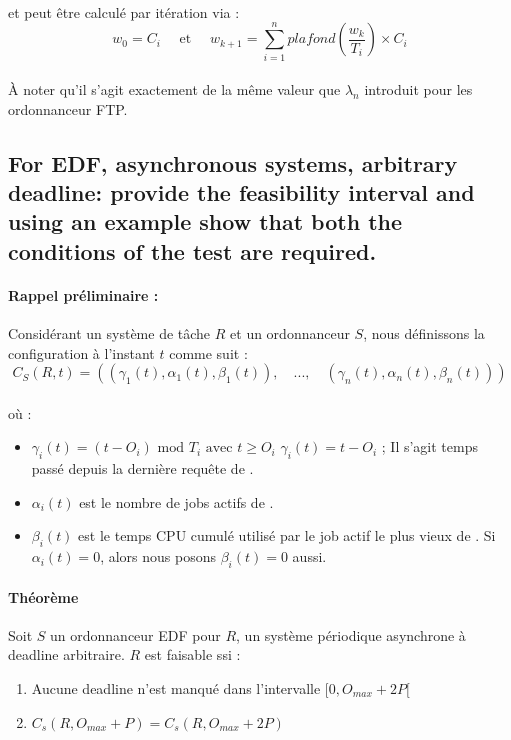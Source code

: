 \paragraph{}
et peut être calculé par itération via :
\begin{equation}
w_{0} = C_{i} \quad  \text{ et } \quad
w_{k+1} = \sum_{i=1}^{n} plafond \left(\frac{w_{k}}{T_{i}} \right) \times C_{i}
\end{equation}
\paragraph{}
À noter qu'il s'agit exactement de la même valeur que $\lambda_{n}$ introduit pour les ordonnanceur FTP.
\subsection{For EDF, asynchronous systems, arbitrary deadline: provide the feasibility interval and using an example show that both the conditions of the test are required.}

\paragraph{Rappel préliminaire : } Considérant un système de tâche $R$ et un ordonnanceur $S$, nous définissons la configuration à l'instant $t$ comme suit :
\begin{equation}
C_{S} (R,t) = ((\gamma_{1}(t), \alpha_{1}(t), \beta_{1}(t)), \quad ..., \quad (\gamma_{n}(t), \alpha_{n}(t), \beta_{n}(t)))
\end{equation}
\paragraph{} où :
\begin{itemize}
\item $\gamma_{i}(t) = (t - O_{i}) \text{ mod } T_{i} \text{ avec } t \geq O_{i}$   $\gamma_{i}(t) = t - O_{i}$ ; Il s'agit temps passé depuis la dernière requête de \ti.
\item $\alpha_{i}(t)$ est le nombre de jobs actifs de \ti.
\item $\beta_{i}(t)$ est le temps CPU cumulé utilisé par le job actif le plus vieux de \ti. Si $\alpha_{i}(t) = 0$, alors nous posons $\beta_{i}(t) = 0$ aussi.
\end{itemize}

\paragraph{Théorème} Soit $S$ un ordonnanceur EDF pour $R$, un système périodique asynchrone à deadline arbitraire. $R$ est faisable ssi : 
\begin{enumerate}
\item Aucune deadline n'est manqué dans l'intervalle $[0, O_{max} + 2P[$
\item $C_{s}(R, O_{max} + P) = C_{s}(R, O_{max} + 2P)$ 
\end{enumerate}


